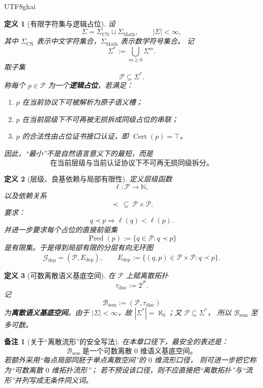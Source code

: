 \documentclass[12pt]{article}
\newtheorem{definition}{定义}[section]
\newtheorem{remark}{备注}[section]
\newcommand{\NN}{\mathbb{N}}
\newcommand{\Cert}{\operatorname{Cert}}
\begin{document}
\begin{CJK*}{UTF8}{gkai}
\begin{definition}[有限字符集与逻辑占位]
\label{def:tex37-ch13-placeholder}
设
\[
  \Sigma=\Sigma_{\mathrm{CN}}\sqcup \Sigma_{\mathrm{Math}},
  \qquad
  |\Sigma|<\infty,
\]
其中 $\Sigma_{\mathrm{CN}}$ 表示中文字符集合，$\Sigma_{\mathrm{Math}}$ 表示数学符号集合。
记
\[
  \Sigma^\ast:=\bigcup_{m\ge 0}\Sigma^m.
\]
取子集
\[
  \mathcal P\subseteq \Sigma^\ast.
\]
称每个 $p\in\mathcal P$ 为一个\textbf{逻辑占位}，若满足：
\begin{enumerate}
  \item $p$ 在当前协议下可被解析为原子语义槽；
  \item $p$ 在当前层级下不可再被无损拆成同级占位的串联；
  \item $p$ 的合法性由占位证书接口认证，即 $\Cert(p)=\top$。
\end{enumerate}
因此，“最小”不是自然语言意义下的最短，而是
\[
  \boxed{
    \text{在当前层级与当前认证协议下不可再无损同级拆分。}
  }
\]
\end{definition}

\begin{definition}[层级、良基依赖与局部有限性]
\label{def:tex37-ch13-dependency}
定义层级函数
\[
  \ell:\mathcal P\to \NN,
\]
以及依赖关系
\[
  \prec\ \subseteq\ \mathcal P\times \mathcal P.
\]
要求：
\[
  q\prec p \Longrightarrow \ell(q)<\ell(p).
\]
并进一步要求每个占位的直接前驱集
\[
  \operatorname{Pred}(p):=\{q\in\mathcal P:q\prec p\}
\]
是有限集。于是得到局部有限的分层有向无环图
\[
  \mathcal G_{\mathrm{dep}}=(\mathcal P,E_{\mathrm{dep}}),
  \qquad
  E_{\mathrm{dep}}:=\{(q,p)\in\mathcal P\times \mathcal P:q\prec p\}.
\]
\end{definition}

\begin{definition}[可数离散语义基底空间]
\label{def:tex37-ch13-base}
在 $\mathcal P$ 上赋离散拓扑
\[
  \tau_{\mathrm{disc}}:=2^{\mathcal P}.
\]
记
\[
  \mathcal B_{\mathrm{sem}}:=(\mathcal P,\tau_{\mathrm{disc}})
\]
为\textbf{离散语义基底空间}。由于 $|\Sigma|<\infty$，故 $|\Sigma^\ast|=\aleph_0$；又 $\mathcal P\subseteq \Sigma^\ast$，
所以 $\mathcal B_{\mathrm{sem}}$ 至多可数。
\end{definition}

\begin{remark}[关于“离散流形”的安全写法]
\label{rem:tex37-ch13-discrete-manifold}
在本章口径下，最安全的表述是：
\[
  \boxed{
    \mathcal B_{\mathrm{sem}}\ \text{是一个可数离散 }0\text{ 维语义基底空间。}
  }
\]
若额外采用“每点局部同胚于单点离散空间”的 $0$ 维流形口径，
则可进一步把它称为“可数离散 $0$ 维拓扑流形”；
若不预设该口径，则不应直接把“离散拓扑”与“流形”并列写成无条件同义词。
\end{remark}


\end{CJK*}
\end{document}
